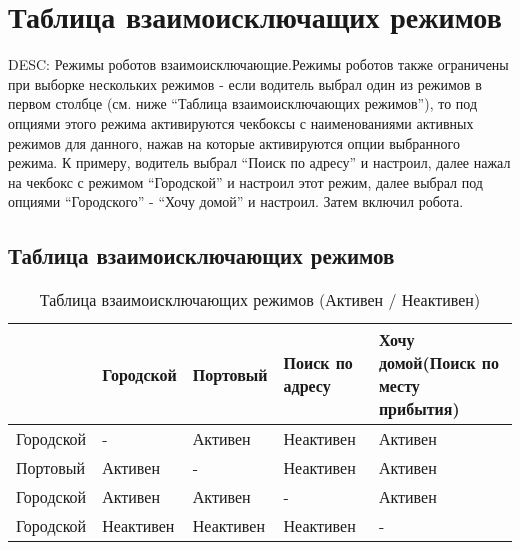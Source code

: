 \section{Таблица взаимоисключащих режимов}

	DESC: Режимы роботов взаимоисключающие.Режимы роботов также ограничены при выборке нескольких режимов - если водитель выбрал один из режимов в первом столбце (см. ниже “Таблица взаимоисключающих режимов”), то под опциями этого режима активируются чекбоксы с наименованиями активных режимов для данного, нажав на которые активируются опции выбранного режима. К примеру, водитель выбрал “Поиск по адресу” и настроил, далее нажал на чекбокс с режимом “Городской” и настроил этот режим, далее выбрал под опциями “Городского” - “Хочу домой” и настроил. Затем включил робота.

	\subsection{Таблица взаимоисключающих режимов}

		\begin{table}[htb]
	        \begin{center}
	        \caption{Таблица взаимоисключающих режимов (Активен / Неактивен)}
	        \label{appendices_termins}
	        \setlength{\extrarowheight}{2mm}
	        \begin{tabular}{|p{3cm}|p{2cm}|p{2cm}|p{2cm}|p{3cm}|}
	           \hline   \textbf{}&\textbf{Городской}&\textbf{Портовый}&\textbf{Поиск по адресу}&\textbf{Хочу домой(Поиск по месту прибытия)} \\ [2mm]


	           \hline Городской & - & Активен & Неактивен & Активен\\ [2mm]

	           \hline Портовый & Активен & - & Неактивен & Активен\\ [2mm]

	           \hline Городской & Активен & Активен & - & Активен\\ [2mm]

	           \hline Городской & Неактивен & Неактивен & Неактивен & -\\ [2mm]    

	           \hline
	        \end{tabular}
	        \end{center}
      	\end{table}